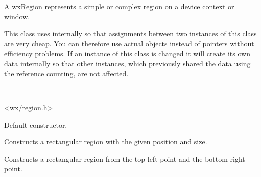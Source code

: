 
\section{}\label{wxregion}

A wxRegion represents a simple or complex region on a device context or window.

This class uses 
internally so that assignments between two instances of this class are very
cheap. You can therefore use actual objects instead of pointers without
efficiency problems. If an instance of this class is changed it will create
its own data internally so that other instances, which previously shared the
data using the reference counting, are not affected.


\\


<wx/region.h>







\label{wxregionctor}


Default constructor.


Constructs a rectangular region with the given position and size.


Constructs a rectangular region from the top left point and the bottom right point.

